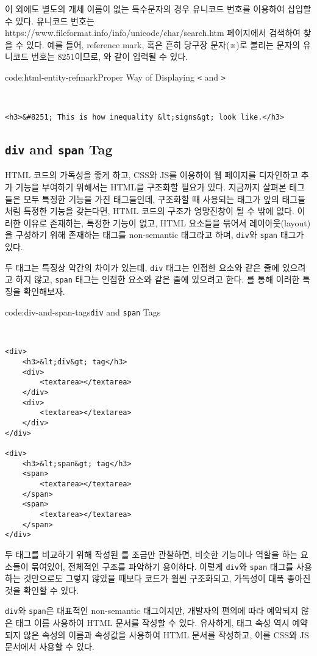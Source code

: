 이 외에도 별도의 개체 이름이 없는 특수문자의 경우 유니코드 번호를 이용하여 삽입할 수 있다. 유니코드 번호는 https://www.fileformat.info/info/unicode/char/search.htm 페이지에서 검색하여 찾을 수 있다. 예를 들어, reference mark, 혹은 흔히 당구장 문자(※)로 불리는 문자의 유니코드 번호는 8251이므로, 와 같이 입력될 수 있다.

\begin{codeenv}{code:html-entity-refmark}{Proper Way of Displaying \texttt{<} and \texttt{>}}\begin{verbatim}


<h3>&#8251; This is how inequality &lt;signs&gt; look like.</h3>
\end{verbatim}
\end{codeenv}

\subsection*{\texttt{div} and \texttt{span} Tag}
HTML 코드의 가독성을 좋게 하고, CSS와 JS를 이용하여 웹 페이지를 디자인하고 추가 기능을 부여하기 위해서는 HTML을 구조화할 필요가 있다. 지금까지 살펴본 태그들은 모두 특정한 기능을 가진 태그들인데, 구조화할 때 사용되는 태그가 앞의 태그들처럼 특정한 기능을 갖는다면, HTML 코드의 구조가 엉망진창이 될 수 밖에 없다. 이러한 이유로 존재하는, 특정한 기능이 없고, HTML 요소들을 묶어서 레이아웃(layout)을 구성하기 위해 존재하는 태그를 non-semantic 태그라고 하며, \texttt{div}와 \texttt{span} 태그가 있다. 

두 태그는 특징상 약간의 차이가 있는데, \texttt{div} 태그는 인접한 요소와 같은 줄에 있으려고 하지 않고, \texttt{span} 태그는 인접한 요소와 같은 줄에 있으려고 한다. 를 통해 이러한 특징을 확인해보자.

\begin{codeenv}{code:div-and-span-tags}{\texttt{div} and \texttt{span} Tags}\begin{verbatim}


<div>
    <h3>&lt;div&gt; tag</h3>
    <div>
        <textarea></textarea>
    </div>
    <div>
        <textarea></textarea>
    </div>
</div>

<div>
    <h3>&lt;span&gt; tag</h3>
    <span>
        <textarea></textarea>
    </span>
    <span>
        <textarea></textarea>
    </span>
</div>
\end{verbatim}
\end{codeenv}

두 태그를 비교하기 위해 작성된 를 조금만 관찰하면, 비슷한 기능이나 역할을 하는 요소들이 묶여있어, 전체적인 구조를 파악하기 용이하다. 이렇게 \texttt{div}와 \texttt{span} 태그를 사용하는 것만으로도 그렇지 않았을 때보다 코드가 훨씬 구조화되고, 가독성이 대폭 좋아진 것을 확인할 수 있다. 

\texttt{div}와 \texttt{span}은 대표적인 non-semantic 태그이지만, 개발자의 편의에 따라 예약되지 않은 태그 이름 사용하여 HTML 문서를 작성할 수 있다. 유사하게, 태그 속성 역시 예약되지 않은 속성의 이름과 속성값을 사용하여 HTML 문서를 작성하고, 이를 CSS와 JS 문서에서 사용할 수 있다.
